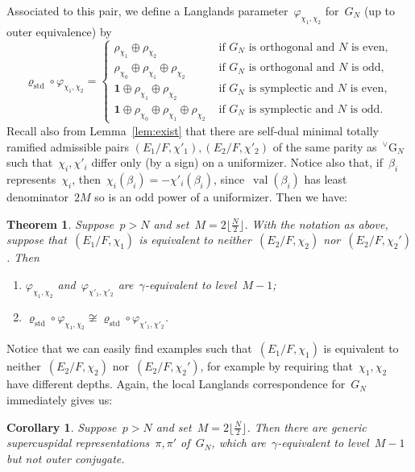 \documentclass[12pt]{amsart}
\newcommand{\G}{\mathrm{G}}
\newcommand{\val}{\operatorname{val}}
\def\boI{\boldsymbol 1}
\def\rhostd{\varrho_{\mathrm{std}}} %
\def\vG{{}^\vee\G}
\newtheorem{thm}{Theorem}[section]
\newtheorem{cor}[thm]{Corollary}
\newtheorem{thm}[equation]{Theorem}
\newtheorem{cor}[equation]{Corollary}
\begin{document}
Associated to this pair, we define a Langlands parameter~$\varphi_{\chi_1,\chi_2}$ for~$G_N$ (up to outer equivalence) by
\[
\rhostd\circ \varphi_{\chi_1,\chi_2} = \begin{cases} 
\rho_{\chi_1}\oplus\rho_{\chi_2} &\text{ if~$G_N$ is orthogonal and~$N$ is even},\\
\rho_{\chi_0}\oplus\rho_{\chi_1}\oplus\rho_{\chi_2} &\text{ if~$G_N$ is orthogonal and~$N$ is odd},\\
\boI\oplus\rho_{\chi_1}\oplus\rho_{\chi_2} &\text{ if~$G_N$ is symplectic and~$N$ is even},\\
\boI\oplus\rho_{\chi_0}\oplus\rho_{\chi_1}\oplus\rho_{\chi_2} &\text{ if~$G_N$ is symplectic and~$N$ is odd}.
\end{cases}
\]
Recall also from Lemma~\ref{lem:exist} that there are self-dual minimal totally ramified admissible pairs $(E_1/F,\chi'_1),(E_2/F,\chi'_2)$ of the same parity as~$\vG_N$ such that~$\chi_i,\chi'_i$ differ only (by a sign) on a uniformizer. Notice also that, if~$\beta_i$ represents~$\chi_i$, then~$\chi_i(\beta_i)=-\chi'_i(\beta_i)$, since~$\val(\beta_i)$ has least denominator~$2M$ so is an odd power of a uniformizer. Then we have:

\begin{thm}\label{thm:cusp}
Suppose~$p>N$ and set~$M=2\lfloor\frac N2\rfloor$. With the notation as above, suppose that~$(E_1/F,\chi_1)$ is equivalent to neither~$(E_2/F,\chi_2)$ nor~$(E_2/F,\chi_2')$. Then
\begin{enumerate}
\item\label{thm:cusp.i} $\varphi_{\chi_1,\chi_2}$ and~$\varphi_{\chi'_1,\chi'_2}$ are~$\gamma$-equivalent to level~$M-1$;
\item\label{thm:cusp.ii} $\rhostd\circ\varphi_{\chi_1,\chi_2}\not\cong\rhostd\circ\varphi_{\chi'_1,\chi'_2}$.
\end{enumerate}
\end{thm}

Notice that we can easily find examples such that~$(E_1/F,\chi_1)$ is equivalent to neither~$(E_2/F,\chi_2)$ nor~$(E_2/F,\chi_2')$, for example by requiring that~$\chi_1,\chi_2$ have different depths. Again, the local Langlands correspondence for~$G_N$ immediately gives us:

\begin{cor}\label{cor:cusp}
Suppose~$p>N$ and set~$M=2\lfloor\frac N2\rfloor$. Then there are generic supercuspidal representations~$\pi,\pi'$ of~$G_N$, which are~$\gamma$-equivalent to level~$M-1$ but not outer conjugate.
\end{cor}
\end{document}
